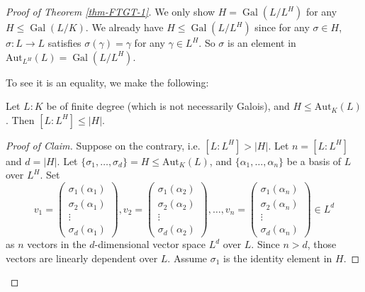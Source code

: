 \begin{proof}[Proof of Theorem \ref{thm-FTGT-1}]
    We only show $H=\operatorname{Gal}(L /L^{H})$ for any $H\leq \operatorname{Gal}(L /K)$. We already have $H\leq \operatorname{Gal}(L /L^{H})$ since for any $\sigma \in H$, $\sigma:L\to L$ satisfies $\sigma(\gamma)=\gamma$ for any $\gamma\in L^{H}$. So $\sigma$ is an element in $\mathrm{Aut}_{L^{H}}(L)=\operatorname{Gal}(L /L^{H})$. 

    To see it is an equality, we make the following: 
    
    \begin{claim}
    Let $L : K$ be of finite degree (which is not necessarily Galois), and $H\leq \mathrm{Aut}_{K}(L)$. Then $[L:L^{H}]\leq \left| H \right| $.
    \end{claim}
    \begin{proof}[Proof of Claim]
        Suppose on the contrary, i.e. $[L:L^{H}]>\left| H \right| $. Let $n=[L:L^{H}]$ and $d=\left| H \right| $. Let $\{\sigma_{1},\dots,\sigma_{d}\}=H\leq \mathrm{Aut}_{K}(L)$,  and $\{\alpha_{1},\dots, \alpha_{n}\}$ be a basis of $L$ over $L^{H}$. Set 
        \[
        v_{1}=\begin{pmatrix}
            \sigma_{1}(\alpha_{1})\\
            \sigma_{2}(\alpha_{1})\\
            \vdots\\
            \sigma_{d}(\alpha_{1})
        \end{pmatrix},
        v_{2}=\begin{pmatrix}
            \sigma_{1}(\alpha_{2})\\
            \sigma_{2}(\alpha_{2})\\
            \vdots\\
            \sigma_{d}(\alpha_{2})
        \end{pmatrix},
        \dots, 
        v_{n}=\begin{pmatrix}
            \sigma_{1}(\alpha_{n})\\
            \sigma_{2}(\alpha_{n})\\
            \vdots\\
            \sigma_{d}(\alpha_{n})
        \end{pmatrix}
        \in L^{d}
        \] 
        as $n$ vectors in the $d$-dimensional vector space $L^{d}$ over $L$. Since $n>d$, those vectors are linearly dependent over $L$. Assume $\sigma_{1}$ is the identity element in $H$. 


\end{proof}
\end{proof}
